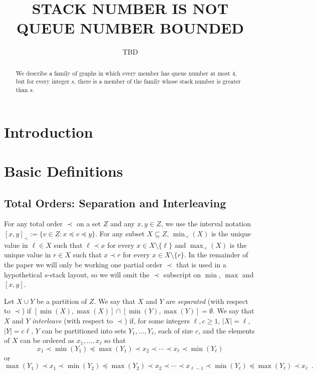 \documentclass[kpfonts]{patmorin}
\title{\MakeUppercase{Stack Number is not Queue Number Bounded}}
\author{TBD}
\begin{document}
\maketitle

\begin{abstract}
  We describe a family of graphs in which every member has queue number at most 4, but for every integer $s$, there is a member of the family whose stack number is greater than $s$.
\end{abstract}

\section{Introduction}


\section{Basic Definitions}


\subsection{Total Orders: Separation and Interleaving}
For any total order $\prec$ on a set $Z$ and any $x,y\in Z$, we use the interval notation $[x,y]_\prec:=\{v\in Z: x\preceq v\preceq y\}$.  For any subset $X\subseteq Z$, $\min_\prec(X)$ is the unique value in $\ell\in X$ such that $\ell\prec x$ for every $x\in X\setminus\{\ell\}$ and $\max_\prec(X)$ is the unique value in $r\in X$ such that $x\prec r$ for every $x\in X\setminus\{r\}$.  In the remainder of the paper we will only be working one partial order $\prec$ that is used in a hypothetical $s$-stack layout, so we will omit the $\prec$ subscript on $\min$, $\max$ and $[x,y]$.

Let $X\cup Y$ be a partition of $Z$.  We say that $X$ and $Y$ are \emph{separated} (with respect to $\prec$) if $[\min(X),\max(X)]\cap [\min(Y),\max(Y)]=\emptyset$.  We say that $X$ and $Y$ \emph{interleave} (with respect to $\prec$) if, for some integers $\ell,c\ge 1$, $|X|=\ell$, $|Y|=c\ell$, $Y$ can be partitioned into sets $Y_1,\ldots,Y_{\ell}$, each of size $c$, and the elements of $X$ can be ordered as $x_1,\ldots,x_\ell$ so that 
\[  
  x_1\prec \min(Y_1) \preceq \max(Y_1) \prec x_2 \prec \cdots \prec x_{\ell} \prec \min(Y_\ell) 
\]
or 
\[  
  \max(Y_1) \prec x_1 \prec\min(Y_2)\preceq \max(Y_2)\prec x_2 \prec \cdots \prec x_{\ell-1} \prec \min(Y_\ell) \preceq \max(Y_\ell) \prec x_\ell \enspace . 
\]
\end{document}
